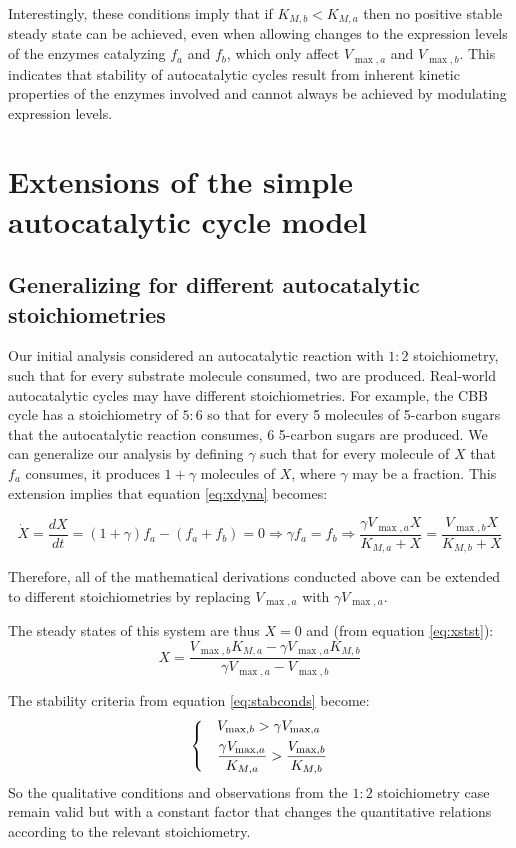 \documentclass[a4page,notitlepage]{article}
\begin{document}
    Interestingly, these conditions imply that if $K_{M,b}<K_{M,a}$ then no positive stable steady state can be achieved, even when allowing changes to the expression levels of the enzymes catalyzing $f_a$ and $f_b$, which only affect $V_{\max,a}$ and $V_{\max,b}$.
    This indicates that stability of autocatalytic cycles result from inherent kinetic properties of the enzymes involved and cannot always be achieved by modulating expression levels.
\section{Extensions of the simple autocatalytic cycle model}
    \subsection{Generalizing for different autocatalytic stoichiometries}
    Our initial analysis considered an autocatalytic reaction with $1:2$ stoichiometry, such that for every substrate molecule consumed, two are produced.
    Real-world autocatalytic cycles may have different stoichiometries.
    For example, the CBB cycle has a stoichiometry of $5:6$ so that for every 5 molecules of 5-carbon sugars that the autocatalytic reaction consumes, 6 5-carbon sugars are produced.
    We can generalize our analysis by defining $\gamma$ such that for every molecule of $X$ that $f_a$ consumes, it produces $1+\gamma$ molecules of $X$, where $\gamma$ may be a fraction.
    This extension implies that equation \eqref{eq:xdyna} becomes:

    \begin{equation*}
      \dot X = \frac{dX}{dt} = (1+\gamma)f_a - (f_a + f_b) = 0 \Rightarrow \gamma f_a = f_b \Rightarrow \frac{\gamma V_{\max,a}X}{K_{M,a}+X}=\frac{V_{\max,b}X}{K_{M,b}+X}
    \end{equation*}

    Therefore, all of the mathematical derivations conducted above can be extended to different stoichiometries by replacing $V_{\max,a}$ with $\gamma V_{\max,a}$.

    The steady states of this system are thus $X=0$ and (from equation \eqref{eq:xstst}):
    \begin{equation*}
      X=\frac{V_{\max,b}K_{M,a}-\gamma V_{\max,a}K_{M,b}}{\gamma V_{\max,a}-V_{\max,b}}
    \end{equation*}

    The stability criteria from equation \eqref{eq:stabconds} become:
    \begin{equation*}
    \begin{dcases}
      & V_{\max,b}>\gamma V_{\max,a} \\
      & \frac{\gamma V_{\max,a}}{K_{M,a}}>\frac{V_{\max,b}}{K_{M,b}}
    \end{dcases}
    \end{equation*}
    So the qualitative conditions and observations from the $1:2$ stoichiometry case remain valid but with a constant factor that changes the quantitative relations according to the relevant stoichiometry.
\end{document}
